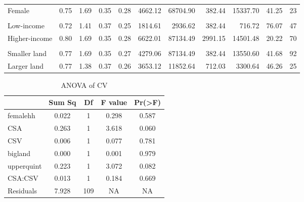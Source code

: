 \documentclass[
]{article}
\begin{document}
\begin{table}
{\begin{tabular}[t]{lrrrrrrrrrr}
\rowcolor{gray!6}  \hspace{1em}Female & 0.75 & 1.69 & 0.35 & 0.28 & 4662.12 & 68704.90 & 382.44 & 15337.70 & 41.25 & 23\\
\addlinespace[0.3em]
\multicolumn{11}{l}{\textbf{Income}}\\
\hspace{1em}Low-income & 0.72 & 1.41 & 0.37 & 0.25 & 1814.61 & 2936.62 & 382.44 & 716.72 & 76.07 & 47\\
\rowcolor{gray!6}  \hspace{1em}Higher-income & 0.80 & 1.69 & 0.35 & 0.28 & 6622.01 & 87134.49 & 2991.15 & 14501.48 & 20.22 & 70\\
\addlinespace[0.3em]
\multicolumn{11}{l}{\textbf{Plot size}}\\
\hspace{1em}Smaller land & 0.77 & 1.69 & 0.35 & 0.27 & 4279.06 & 87134.49 & 382.44 & 13550.60 & 41.68 & 92\\
\rowcolor{gray!6}  \hspace{1em}Larger land & 0.77 & 1.38 & 0.37 & 0.26 & 3653.12 & 11852.64 & 712.03 & 3300.64 & 46.26 & 25\\
\bottomrule
\end{tabular}}
\end{table}

\begin{table}

\caption{\label{tab:printtables}ANOVA of CV}
\centering
\begin{tabular}[t]{lcccc}
\toprule
  & Sum Sq & Df & F value & Pr(>F)\\
\midrule
femalehh & 0.022 & 1 & 0.298 & 0.587\\
 
CSA & 0.263 & 1 & 3.618 & 0.060\\
 
CSV & 0.006 & 1 & 0.077 & 0.781\\
 
bigland & 0.000 & 1 & 0.001 & 0.979\\
 
upperquint & 0.223 & 1 & 3.072 & 0.082\\
 
CSA:CSV & 0.013 & 1 & 0.184 & 0.669\\
 
Residuals & 7.928 & 109 & NA & NA\\
\bottomrule
\end{tabular}
\end{table}
\end{document}
